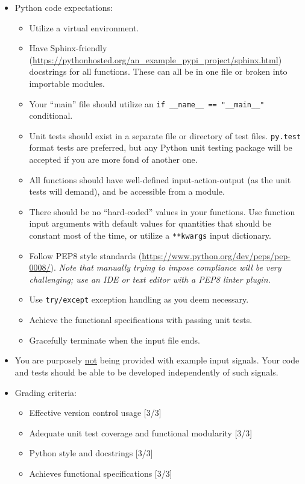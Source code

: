 \begin{itemize}
\item Python code expectations:
\begin{itemize}
    \item Utilize a virtual environment.
    \item Have Sphinx-friendly (\url{https://pythonhosted.org/an_example_pypi_project/sphinx.html}) docstrings for all functions.  These can all be in one file or broken into importable modules.
    \item Your ``main'' file should utilize an \verb+if __name__ == "__main__"+ conditional.
    \item Unit tests should exist in a separate file or directory of test files.  \verb+py.test+ format tests are preferred, but any Python unit testing package will be accepted if you are more fond of another one.
    \item All functions should have well-defined input-action-output (as the unit tests will demand), and be accessible from a module.
    \item There should be no ``hard-coded'' values in your functions.  Use function input arguments with default values for quantities that should be constant most of the time, or utilize a \verb+**kwargs+ input dictionary.
    \item Follow PEP8 style standards (\url{https://www.python.org/dev/peps/pep-0008/}).  \emph{Note that manually trying to impose compliance will be very challenging; use an IDE or text editor with a PEP8 linter plugin.}
    \item Use \verb+try/except+ exception handling as you deem necessary.
    \item Achieve the functional specifications with passing unit tests.
    \item Gracefully terminate when the input file ends.
\end{itemize}

\item You are purposely \underline{not} being provided with example input signals.  Your code and tests should be able to be developed independently of such signals.

\item Grading criteria:
\begin{itemize}
    \item Effective version control usage [3/3]
    \item Adequate unit test coverage and functional modularity [3/3]
    \item Python style and docstrings [3/3]
    \item Achieves functional specifications [3/3]
\end{itemize}

\end{itemize}

